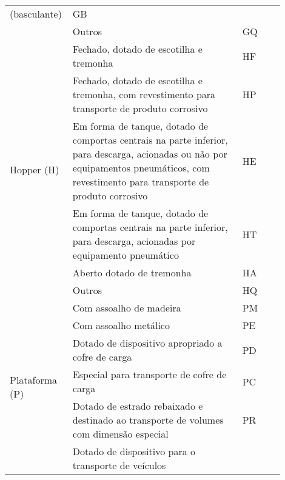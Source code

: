 \begin{longtable}{p{0.15\linewidth}p{0.6\linewidth}p{0.15\linewidth}}
                                                (basculante)                                            & GB \\
                                            & Outros                                                    & GQ \\ \midrule
         \multirow{6}{2.5cm}{Hopper (H)}   & Fechado, dotado de escotilha e tremonha                   & HF \\
                                            & Fechado, dotado de escotilha e tremonha, com 
                                                revestimento para transporte de produto corrosivo       & HP \\
                                            & Em forma de tanque, dotado de comportas centrais na
                                            parte inferior, para descarga, acionadas ou não
                                            por equipamentos pneumáticos, com revestimento para
                                            transporte de produto corrosivo                             & HE \\
                                            & Em forma de tanque, dotado de comportas centrais na parte
                                            inferior, para descarga, acionadas por equipamento pneumático& HT\\
                                            & Aberto dotado de tremonha                                 & HA \\
                                            & Outros                                                    & HQ \\ \midrule
          \multirow{11}{2.5cm}{Plataforma (P)}& Com assoalho de madeira                                 & PM \\
                                            & Com assoalho metálico                                     & PE \\
                                            & Dotado de dispositivo apropriado a cofre de carga         & PD \\
                                            & Especial para transporte de cofre de carga                & PC \\
                                            & Dotado de estrado rebaixado e destinado ao transporte de
                                            volumes com dimensão especial                               & PR \\
                                            & Dotado de dispositivo para o transporte de veículos 

\end{longtable}
